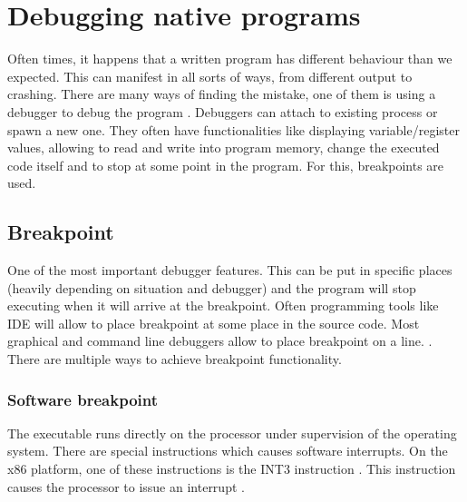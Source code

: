 \chapter{Debugging native programs}
Often times, it happens that a written program has different behaviour than we expected. This can manifest in all sorts of ways, from different output to crashing. There are many ways of finding the mistake, one of them is using a debugger to debug the program \cite{software-debugging-testing-verification}.
Debuggers can attach to existing process or spawn a new one. They often have functionalities like displaying variable/register values, allowing to read and write into program memory, change the executed code itself and to stop at some point in the program. For this, breakpoints are used.

\section{Breakpoint}
One of the most important debugger features. This can be put in specific places (heavily depending on situation and debugger) and the program will stop executing when it will arrive at the breakpoint. Often programming tools like IDE will allow to place breakpoint at some place in the source code. Most graphical and command line debuggers allow to place breakpoint on a line. . There are multiple ways to achieve breakpoint functionality.

\subsection{Software breakpoint}
The executable runs directly on the processor under supervision of the operating system. There are special instructions which causes software interrupts. On the x86 platform, one of these instructions is the INT3 instruction \cite{xmlgen}. This instruction causes the processor to issue an interrupt .


